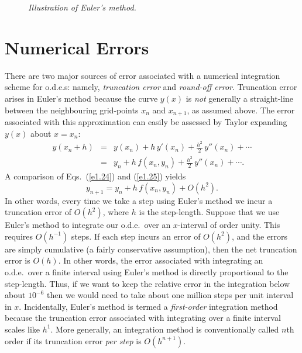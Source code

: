 \begin{figure}
\epsfysize=2.5in
\centerline{}
\caption{\em Illustration of Euler's method.}\label{f2}
\end{figure}

\section{Numerical Errors}
There are two major sources of error associated with a numerical integration scheme for
o.d.e.s: namely, {\em truncation error}\/ and {\em round-off error}. 
Truncation error arises in Euler's method because the curve $y(x)$ is {\em not}\/
generally a straight-line between the neighbouring grid-points
$x_n$ and $x_{n+1}$, as assumed above. The error associated with this
approximation can easily be assessed by Taylor expanding $y(x)$ about
$x=x_n$:
\begin{eqnarray}
y(x_n + h) &= &y(x_n) + h\,y'(x_n)+ \frac{h^2}{2}\,y''(x_n)+\cdots\nonumber\\[0.5ex]
& = &y_n + h\,f(x_n,y_n) + \frac{h^2}{2}\,y''(x_n)+\cdots.\label{e1.25}
\end{eqnarray}
A comparison of Eqs.~(\ref{e1.24}) and (\ref{e1.25}) yields
\begin{equation}
y_{n+1} = y_n + h\,f(x_n,y_n) + O(h^2).
\end{equation}
In other words, every time we take a step using Euler's method we incur
a truncation error of $O(h^2)$, where $h$ is the step-length. Suppose that we
use Euler's method to integrate our o.d.e.\ over an $x$-interval of
order unity. This requires $O(h^{-1})$ steps. If each step incurs an
error of $O(h^2)$, and the errors are simply cumulative
(a fairly conservative assumption), then the net truncation
error is $O(h)$. In other words, the error associated with integrating
an o.d.e.\ over a finite interval using Euler's method is directly
proportional to the step-length. Thus, if we want to keep the relative
error in the integration below about $10^{-6}$ then we would need to
take about one million steps per unit interval in $x$. Incidentally,
Euler's method is termed a {\em first-order}\/ integration method because the
truncation
error associated with integrating over a finite interval scales like
$h^1$. 
More generally, an integration 
 method is conventionally called $n$th order if its truncation
error {\em per step}\/ is $O(h^{n+1})$. 

